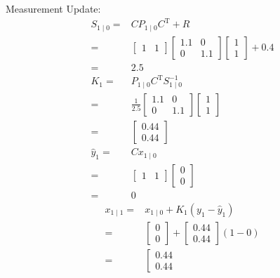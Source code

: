 \documentclass[twoside]{article}
\renewcommand{\t}{^\mathrm{T}{}}
\begin{document}
\begin{itemize}
	Measurement Update:
	\begin{align*}
		S_{1\mid 0} =& C P_{1\mid0}C\t+R\\
		=& \left[\begin{array}{cc}
			1 & 1
		\end{array} \right] \left[ \begin{array}{cc}
		1.1 & 0 \\ 0 & 1.1
	\end{array}\right]\left[ \begin{array}{c}
	1 \\ 1
	\end{array}\right] + 0.4\\
	 =& 2.5\\
	 K_1 =& P_{1\mid0}C\t S^{-1}_{1\mid0}\\
	 =&\frac{1}{2.5}\left[ \begin{array}{cc}
	 	1.1 & 0 \\ 0 & 1.1
	 \end{array}\right]\left[ \begin{array}{c}
	 1 \\ 1
	 \end{array}\right]\\
	=& \left[ \begin{array}{c}
		0.44 \\ 0.44
	\end{array}\right]\\
	\hat y_1 =& C x_{1\mid0}\\
	=& \left[\begin{array}{cc}
		1 & 1
	\end{array} \right] \left[ \begin{array}{c}
	0 \\ 0
	\end{array}\right] \\
	=& 0
\end{align*}
\begin{align*}
	x_{1\mid1} =& x_{1\mid0}+K_1(y_1-\hat y_1)\\
	=& \left[ \begin{array}{c}
		0 \\ 0
	\end{array}\right] + \left[ \begin{array}{c}
	0.44 \\ 0.44
	\end{array}\right] (1-0)\\
	 =&\left[ \begin{array}{c}
		0.44 \\ 0.44

\end{array}
\end{align*}
\end{itemize}
\end{document}
